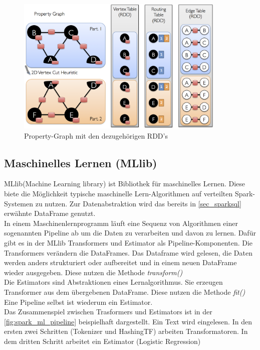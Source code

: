 \begin{figure}[h]
  \centering
  \includegraphics[width=100mm]{./bilder/vertex_routing_edge_tables.png}
  \caption{Property-Graph mit den dezugehörigen RDD's \cite{SPGRAPHX}}\label{fig:spark_graphx}
\end{figure}





\newpage
\subsection{Maschinelles Lernen (MLlib)}\label{sec_sparkmlib}

MLlib(Machine Learning library) ist Bibliothek für maschinelles Lernen. Diese biete die Möglichkeit typische maschinelle Lern-Algorithmen auf verteilten Spark-Systemen zu nutzen. Zur Datenabstraktion wird das bereits in \ref{sec_sparksql} erwähnte DataFrame genutzt.  \\

\noindent
In einem Maschinenlernprogramm läuft eine Sequenz von Algorithmen einer sogenannten Pipeline ab um die Daten zu verarbeiten und davon zu lernen. 
Dafür gibt es in der MLlib Transformers und Estimator als Pipeline-Komponenten.
Die Transformers verändern die DataFrames. Das Dataframe wird gelesen, die Daten werden anders strukturiert oder aufbereitet und in einem neuen DataFrame wieder ausgegeben. Diese nutzen die Methode \textsl{transform()}\\
Die Estimators sind Abstraktionen eines Lernalgorithmus. Sie erzeugen Transformer aus dem übergebenen DataFrame. Diese nutzen die Methode \textsl{fit()}
Eine Pipeline selbst ist wiederum ein Estimator. \\

\noindent
Das Zusammenspiel zwischen Trasformers und Estimators ist in der \autoref{fig:spark_ml_pipeline} beispielhaft dargestellt. Ein Text wird eingelesen. In den ersten zwei Schritten (Tokenizer und HashingTF) arbeiten Transformatoren. In dem dritten Schritt arbeitet ein Estimator (Logistic Regression)
 
